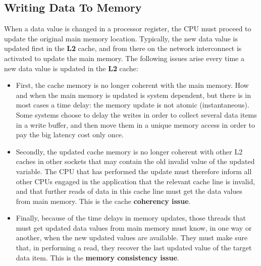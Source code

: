 \documentclass[12pt,a4paper]{article}
\begin{document}
\subsection{Writing Data To Memory}
When a data value is changed in a processor register, the CPU must proceed to update the original main memory location. Typically, the new data value is updated first in the \textbf{L2} cache, and from there on the network interconnect is activated to update the main memory. The following issues arise every time a new data value is updated in the \textbf{L2} cache:
\begin{itemize}
	\item First, the cache memory is no longer coherent with the main memory. How and when the main memory is updated is system dependent, but there is in most cases a time delay: the memory update is not atomic (instantaneous). Some systems choose to delay the writes in order to collect several data items in a write buffer, and then move them in a unique memory access in order to pay the big latency cost only once.
	\item Secondly, the updated cache memory is no longer coherent with other L2 caches in other sockets that may contain the old invalid value of the updated variable. The CPU that has performed the update must therefore inform all other CPUs engaged in the application that the relevant cache line is invalid, and that further reads of data in this cache line must get the data values from main memory. This is the cache \textbf{coherency issue}.
	\item Finally, because of the time delays in memory updates, those threads that must get updated data values from main memory must know, in one way or another, when the new updated values are available. They must make sure that, in performing a read, they recover the last updated value of the target data item. This is the \textbf{memory consistency issue}.
\end{itemize}
\end{document}
